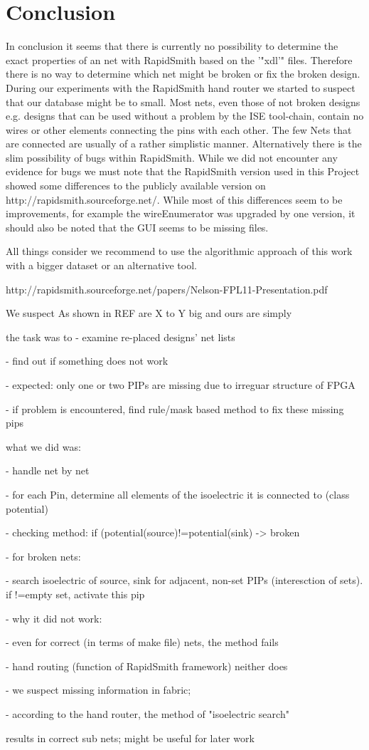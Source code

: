 \chapter{Conclusion}
\label{cha:conclusion}

In conclusion it seems that there is currently no possibility to determine the exact properties of an net with RapidSmith based on the '"xdl'" files. Therefore there is no way to determine which net might be broken or fix the broken design.
During our experiments with the RapidSmith hand router we started to suspect that our database might be to small. Most nets, even those of not broken designs e.g. designs that can be used without a problem by the ISE tool-chain, contain no wires or other elements connecting the pins with each other. The few Nets that are connected are usually of a rather simplistic manner.
Alternatively there is the slim possibility of bugs within RapidSmith. While we did not encounter any evidence for bugs we must note that the RapidSmith version used in this Project showed some differences to the publicly available version on http://rapidsmith.sourceforge.net/. While most of this differences seem to be improvements, for example the wireEnumerator was upgraded by one version, it should also be noted that the GUI seems to be missing files.

All things consider we recommend to use the algorithmic approach of this work with a bigger dataset or an alternative tool.


  http://rapidsmith.sourceforge.net/papers/Nelson-FPL11-Presentation.pdf

We suspect As shown in REF are X to Y big and ours are simply

the task was to
- examine re-placed designs' net lists

- find out if something does not work

- expected: only one or two PIPs are missing due to irreguar structure 
of FPGA

- if problem is encountered, find rule/mask based method to fix these 
missing pips


what we did was:

- handle net by net 

- for each Pin, determine all elements of the isoelectric it is 
connected to (class potential)

- checking method: if (potential(source)!=potential(sink) -> broken


- for broken nets:

 - search isoelectric of source, sink for adjacent, non-set PIPs 
(interesction of sets). if !=empty set, activate this pip


- why it did not work:

  - even for correct (in terms of make file) nets, the method fails

  - hand routing (function of RapidSmith framework) neither does

  - we suspect missing information in fabric;

  - according to the hand router, the method of "isoelectric search" 

results in correct sub nets; might be useful for later work
